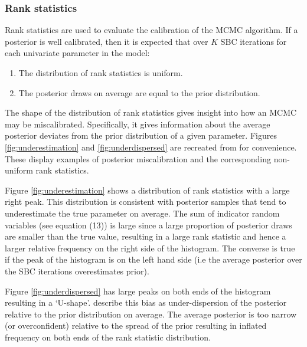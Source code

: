 \documentclass[12pt, a4paper]{article}
\begin{document}
        \subsubsection{Rank statistics}
            Rank statistics are used to evaluate the calibration of the MCMC algorithm. If a posterior is well calibrated, then it is expected that over $K$ SBC iterations for each univariate parameter in the model:

            \begin{enumerate}
                \item The distribution of rank statistics is uniform.
                \item The posterior draws on average are equal to the prior distribution.
            \end{enumerate}

            The shape of the distribution of rank statistics gives insight into how an MCMC may be miscalibrated. Specifically, it gives information about the average posterior deviates from the prior distribution of a given parameter. Figures \ref{fig:underestimation} and \ref{fig:underdispersed} are recreated from \citet{talts2020validating} for convenience. These display examples of posterior miscalibration and the corresponding non-uniform rank statistics.

            Figure \ref{fig:underestimation} shows a distribution of rank statistics with a large right peak. This distribution is consistent with posterior samples that tend to underestimate the true parameter on average. The sum of indicator random variables (see equation (13)) is large since a large proportion of posterior draws are smaller than the true value, resulting in a large rank statistic and hence a larger relative frequency on the right side of the histogram. The converse is true if the peak of the histogram is on the left hand side (i.e the average posterior over the SBC iterations overestimates prior). 

            Figure \ref{fig:underdispersed} has large peaks on both ends of the histogram resulting in a `U-shape'. \citet{talts2020validating} describe this bias as under-dispersion of the posterior relative to the prior distribution on average. The average posterior is too narrow (or overconfident) relative to the spread of the prior resulting in inflated frequency on both ends of the rank statistic distribution. 

        
\end{document}
